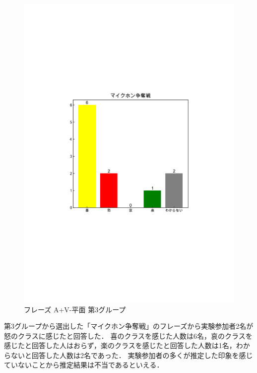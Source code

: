 \begin{figure}[H]
    \centering
    \includegraphics[width=14cm]{436.pdf}
    \vspace{-1mm}
    \caption{フレーズ A+V-平面 第3グループ}
    \label{fig:mms}
    \vspace{5mm}
\end{figure}
第3グループから選出した「マイクホン争奪戦」のフレーズから実験参加者2名が怒のクラスに感じたと回答した．
喜のクラスを感じた人数は6名，哀のクラスを感じたと回答した人はおらず，楽のクラスを感じたと回答した人数は1名，わからないと回答した人数は2名であった．
実験参加者の多くが推定した印象を感じていないことから推定結果は不当であるといえる．
\newpage
